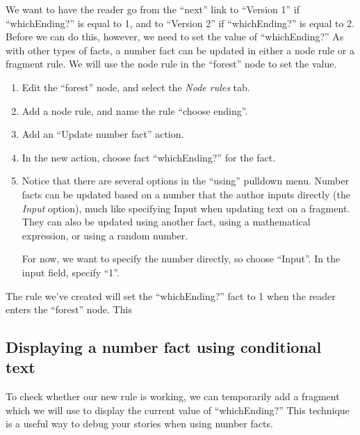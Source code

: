 \documentclass{article}
\begin{document}
We want to have the reader go from the ``next'' link to ``Version 1'' 
if ``whichEnding?'' is equal to 1, and to ``Version 2'' if 
``whichEnding?'' is equal to 2. Before we can do this, however, we 
need to set the value of ``whichEnding?'' As with other types of 
facts, a number fact can be updated in either a node rule or a fragment 
rule. We will use the node rule in the ``forest'' node to set the 
value.      

\begin{enumerate}
    \item Edit the ``forest'' node, and select the \textit{Node rules} tab.
    \item Add a node rule, and name the rule ``choose ending''.
    \item Add an ``Update number fact'' action.
    \item In the new action, choose fact ``whichEnding?'' for the fact.
    \item Notice that there are several options in the ``using'' pulldown menu. Number facts can be updated based on a number that the author inputs directly (the \textit{Input} option), much like specifying Input when updating text on a fragment. They can also be updated using another fact, using a mathematical expression, or using a random number.
    
For now, we want to specify the number directly, so choose ``Input''. In the input field, specify ``1''.
\end{enumerate}

\noindent The rule we've created will set the ``whichEnding?'' fact to 1 when the reader enters the ``forest'' node. This 

\subsection{Displaying a number fact using conditional text}

To check whether our new rule is working, we can temporarily add a fragment which we will use to display the current value of ``whichEnding?'' This technique is a useful way to debug your stories when using number facts.
\end{document}
